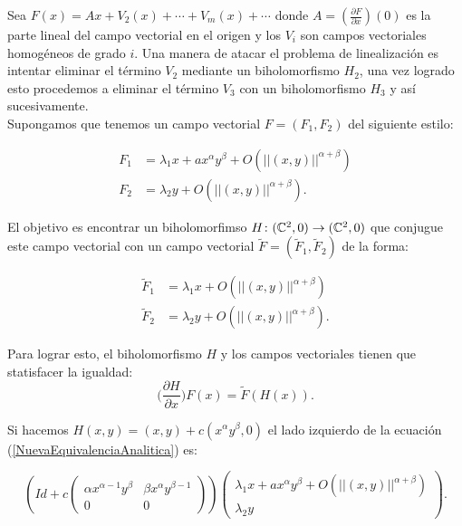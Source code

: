 Sea $F(x)=Ax+V_{2}(x)+\cdots+V_{m}(x)+\cdots$ donde $A=(\tfrac{\partial F}{\partial x})(0)$ es la parte lineal del campo vectorial en el origen y los $V_{i}$ son campos vectoriales homogéneos de grado $i$. Una manera de atacar el problema de linealización es intentar eliminar el término $V_{2}$ mediante un biholomorfismo $H_{2}$, una vez logrado esto procedemos a eliminar el término $V_{3}$ con un biholomorfismo $H_{3}$ y así sucesivamente.\\

Supongamos que tenemos un campo vectorial  $F=(F_{1},F_{2})$ del siguiente estilo:

\begin{equation}
\label{CampoVectInicial}
\begin{aligned}
F_{1} &= \lambda_{1}x +ax^{\alpha}y^{\beta}+O(||(x,y)||^{\alpha+\beta})\\
F_{2} &= \lambda_{2}y + O(||(x,y)||^{\alpha+\beta}).
\end{aligned}
\end{equation}

\noindent El objetivo es encontrar un biholomorfimso $H\colon (\mathbb{C}^{2},0)\rightarrow(\mathbb{C}^{2},0)$ que conjugue este campo vectorial con un campo vectorial $\tilde{F}=(\tilde{F}_{1},\tilde{F}_{2})$ de la forma:

\begin{equation}
\label{CampoVectFinal}
\begin{aligned}
\tilde{F}_{1} &= \lambda_{1}x +O(||(x,y)||^{\alpha+\beta})\\
\tilde{F}_{2} &= \lambda_{2}y + O(||(x,y)||^{\alpha+\beta}).
\end{aligned}
\end{equation}

\noindent Para lograr esto, el biholomorfismo $H$ y los campos vectoriales tienen que statisfacer la igualdad:
\begin{equation}
\label{NuevaEquivalenciaAnalitica}
\Big(\frac{\partial H}{\partial x}\Big)F(x)=\tilde{F}(H(x)).
\end{equation}


\noindent Si hacemos $H(x,y)=(x,y)+c(x^{\alpha}y^{\beta},0)$ el lado izquierdo de la ecuación (\ref{NuevaEquivalenciaAnalitica}) es:

\begin{equation*}
(Id+c\begin{pmatrix} \alpha x^{\alpha -1}y^{\beta} & \beta x^{\alpha}y^{\beta -1} \\ 0 & 0 \end{pmatrix})\begin{pmatrix}\lambda_{1}x +ax^{\alpha}y^{\beta}+O(||(x,y)||^{\alpha+\beta})\\ \lambda_{2}y \end{pmatrix}.
\end{equation*} 

